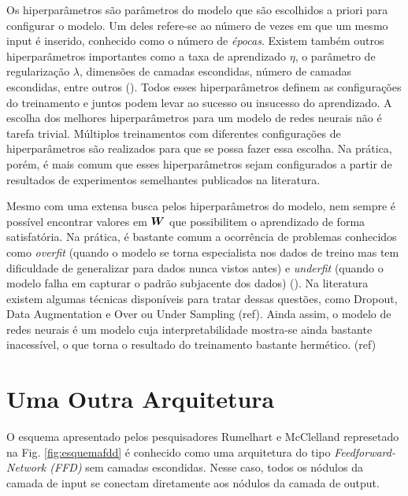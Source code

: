 Os hiperparâmetros são parâmetros do modelo que são escolhidos a priori para configurar o modelo. Um deles refere-se ao número de vezes em que um mesmo input é inserido, conhecido como o número de \textit{épocas}. Existem também outros hiperparâmetros importantes como a taxa de aprendizado $\eta$, o parâmetro de regularização $\lambda$, dimensões de camadas escondidas, número de camadas escondidas, entre outros (\cite{josh:2017}). Todos esses hiperparâmetros definem as configurações do treinamento e juntos podem levar ao sucesso ou insucesso do aprendizado. A escolha dos melhores hiperparâmetros para um modelo de redes neurais não é tarefa trivial. Múltiplos treinamentos com diferentes configurações de hiperparâmetros são realizados para que se possa fazer essa escolha. Na prática, porém, é mais comum que esses hiperparâmetros sejam configurados a partir de resultados de experimentos semelhantes publicados na literatura.   

Mesmo com uma extensa busca pelos hiperparâmetros do modelo, nem sempre é possível encontrar valores em $\bm{W}$ que possibilitem o aprendizado de forma satisfatória. Na prática, é bastante comum a ocorrência de problemas conhecidos como \textit{overfit} (quando o modelo se torna especialista nos dados de treino mas tem dificuldade de generalizar para dados nunca vistos antes) e \textit{underfit} (quando o modelo falha em capturar o padrão subjacente dos dados) (\cite{josh:2017}). Na literatura existem algumas técnicas disponíveis para tratar dessas questões, como Dropout, Data Augmentation e Over ou Under Sampling (ref). Ainda assim, o modelo de redes neurais é um modelo cuja interpretabilidade mostra-se ainda bastante inacessível, o que torna o resultado do treinamento bastante hermético. (ref)   %

\section{Uma Outra Arquitetura}
\label{sec:arqFDD}
O esquema apresentado pelos pesquisadores Rumelhart e McClelland represetado na Fig. \ref{fig:esquemafdd} é conhecido como uma arquitetura do tipo \textit{Feedforward-Network (FFD)} sem camadas escondidas. Nesse caso, todos os nódulos da camada de input se conectam diretamente aos nódulos da camada de output.

